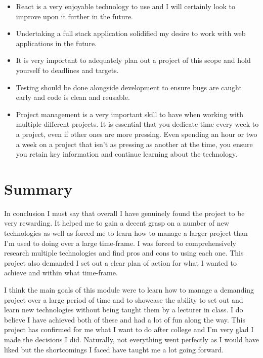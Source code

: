 \begin{itemize}
    \item React is a very enjoyable technology to use and I will certainly look to improve upon it further in the future.
    \item Undertaking a full stack application solidified my desire to work with web applications in the future.
    \item It is very important to adequately plan out a project of this scope and hold yourself to deadlines and targets.
    \item Testing should be done alongside development to ensure bugs are caught early and code is clean and reusable.
    \item Project management is a very important skill to have when working with multiple different projects. It is essential that you dedicate time every week to a project, even if other ones are more pressing. Even spending an hour or two a week on a project that isn't as pressing as another at the time, you ensure you retain key information and continue learning about the technology.
\end{itemize}
\section{Summary}
In conclusion I must say that overall I have genuinely found the project to be very rewarding. It helped me to gain a decent grasp on a number of new technologies as well as forced me to learn how to manage a larger project than I'm used to doing over a large time-frame. I was forced to comprehensively research multiple technologies and find pros and cons to using each one. This project also demanded I set out a clear plan of action for what I wanted to achieve and within what time-frame.

I think the main goals of this module were to learn how to manage a demanding project over a large period of time and to showcase the ability to set out and learn new technologies without being taught them by a lecturer in class. I do believe I have achieved both of these and had a lot of fun along the way. This project has confirmed for me what I want to do after college and I'm very glad I made the decisions I did. Naturally, not everything went perfectly as I would have liked but the shortcomings I faced have taught me a lot going forward.